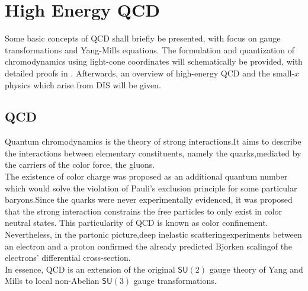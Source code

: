 \setchapterpreamble[u]{\margintoc}
\chapter{High Energy {\sffamily QCD}}

\begin{preview}[]
Some basic concepts of {\sffamily} QCD shall briefly be presented, with focus on gauge transformations and Yang-Mills equations. The formulation and quantization of chromodynamics using light-cone coordinates will schematically be provided, with detailed proofs in . Afterwards, an overview of high-energy {\sffamily QCD} and the small-$x$ physics which arise from {\sffamily DIS} will be given. 
\end{preview}

\section{{\sffamily QCD}}
Quantum chromodynamics is the theory of strong interactions.It aims to describe the interactions between elementary constituents, namely the quarks,mediated by the carriers of the color force, the gluons. \\ 
The existence of color charge was proposed as an additional quantum number which would solve the violation of Pauli's exclusion principle for some particular baryons.Since the quarks were never experimentally evidenced, it was proposed that the strong interaction constrains the free particles to only exist in color neutral states. This particularity of {\sffamily QCD} is known as color confinement. Nevertheless, in the partonic picture,deep inelastic scatteringexperiments between an electron and a proton confirmed the already predicted Bjorken scalingof the electrons' differential cross-section. \\
In essence, {\sffamily QCD} is an extension of the original $\textsf{SU}(2)$ gauge theory of Yang and Mills \cite{yangmills} to local non-Abelian $\textsf{SU}(3)$ gauge transformations.

